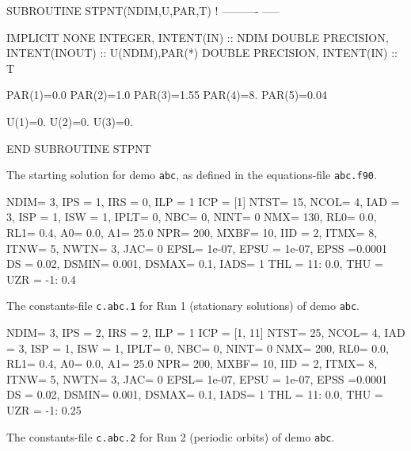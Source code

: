 \documentclass[12pt]{report}
\begin{document}
\begin{table}[htbp]
{\small
\begin{center}
\begin{boxedverbatim}
      SUBROUTINE STPNT(NDIM,U,PAR,T) 
!     ---------- ----- 

      IMPLICIT NONE
      INTEGER, INTENT(IN) :: NDIM
      DOUBLE PRECISION, INTENT(INOUT) :: U(NDIM),PAR(*)
      DOUBLE PRECISION, INTENT(IN) :: T

       PAR(1)=0.0
       PAR(2)=1.0
       PAR(3)=1.55
       PAR(4)=8.
       PAR(5)=0.04

       U(1)=0.
       U(2)=0.
       U(3)=0.

      END SUBROUTINE STPNT
\end{boxedverbatim}
\end{center}
}
\caption{The starting solution for demo {\tt abc}, 
as defined in the equations-file {\tt abc.f90}.}
\label{tbl:demo_abcE2}
\end{table}

\begin{table}[htbp]
{\small
\begin{center}
\begin{boxedverbatim}
NDIM=   3, IPS =   1, IRS =   0, ILP =   1
ICP =  [1]
NTST=  15, NCOL=   4, IAD =   3, ISP =   1, ISW = 1, IPLT= 0, NBC= 0, NINT= 0
NMX=  130, RL0=   0.0, RL1=   0.4, A0=   0.0, A1=  25.0
NPR=  200, MXBF=  10, IID =   2, ITMX=   8, ITNW= 5, NWTN= 3, JAC= 0
EPSL= 1e-07, EPSU = 1e-07, EPSS =0.0001
DS  =  0.02, DSMIN= 0.001, DSMAX=   0.1, IADS=   1
THL =  {11: 0.0}, THU =  {}
UZR =  {-1: 0.4}
\end{boxedverbatim}
\end{center}
}
\caption{The constants-file {\tt c.abc.1} for Run 1 (stationary solutions)
of demo {\tt abc}.}
\label{tbl:demo_abcC1}
\end{table}


\begin{table}[htbp]
{\small
\begin{center}
\begin{boxedverbatim}
NDIM=   3, IPS =   2, IRS =   2, ILP =   1
ICP =  [1, 11]
NTST=  25, NCOL=   4, IAD =   3, ISP =   1, ISW = 1, IPLT= 0, NBC= 0, NINT= 0
NMX=  200, RL0=   0.0, RL1=   0.4, A0=   0.0, A1=  25.0
NPR=  200, MXBF=  10, IID =   2, ITMX=   8, ITNW= 5, NWTN= 3, JAC= 0
EPSL= 1e-07, EPSU = 1e-07, EPSS =0.0001
DS  =  0.02, DSMIN= 0.001, DSMAX=   0.1, IADS=   1
THL =  {11: 0.0}, THU =  {}
UZR =  {-1: 0.25}
\end{boxedverbatim}
\end{center}
}
\caption{The constants-file {\tt c.abc.2} for Run 2 (periodic orbits) 
of demo {\tt abc}.}
\label{tbl:demo_abcC2}
\end{table}
\end{document}
